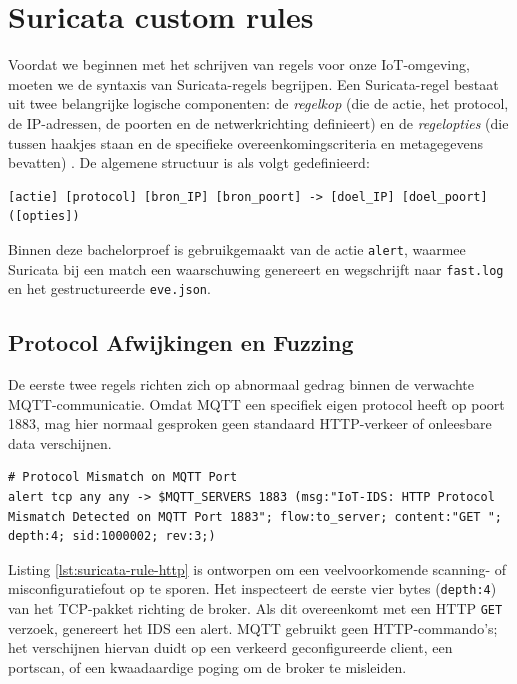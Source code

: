 \section{Suricata custom rules}

Voordat we beginnen met het schrijven van regels voor onze IoT-omgeving, moeten we de syntaxis van Suricata-regels begrijpen.
Een Suricata-regel bestaat uit twee belangrijke logische componenten: de \textit{regelkop} (die de actie, het protocol, de IP-adressen, de poorten en de netwerkrichting definieert) en de \textit{regelopties} (die tussen haakjes staan en de specifieke overeenkomingscriteria en metagegevens bevatten) \autocite{SuricataRulesDiff2024}. De algemene structuur is als volgt gedefinieerd:

\begin{verbatim}
[actie] [protocol] [bron_IP] [bron_poort] -> [doel_IP] [doel_poort] ([opties])
\end{verbatim}

Binnen deze bachelorproef is gebruikgemaakt van de actie \texttt{alert}, waarmee Suricata bij een match een waarschuwing genereert en wegschrijft naar \texttt{fast.log} en het gestructureerde \texttt{eve.json}.

\subsection{Protocol Afwijkingen en Fuzzing}
De eerste twee regels richten zich op abnormaal gedrag binnen de verwachte MQTT-communicatie. Omdat MQTT een specifiek eigen protocol heeft op poort 1883, mag hier normaal gesproken geen standaard HTTP-verkeer of onleesbare data verschijnen.

\begin{listing}[H]
\begin{verbatim}
# Protocol Mismatch on MQTT Port
alert tcp any any -> $MQTT_SERVERS 1883 (msg:"IoT-IDS: HTTP Protocol Mismatch Detected on MQTT Port 1883"; flow:to_server; content:"GET "; depth:4; sid:1000002; rev:3;)
\end{verbatim}
\caption{Suricata-regel voor het detecteren van een protocol-mismatch op de MQTT-poort.}
\label{lst:suricata-rule-http}
\end{listing}

Listing \ref{lst:suricata-rule-http} is ontworpen om een veelvoorkomende scanning- of misconfiguratiefout op te sporen. Het inspecteert de eerste vier bytes (\texttt{depth:4}) van het TCP-pakket richting de broker. Als dit overeenkomt met een HTTP \texttt{GET } verzoek, genereert het IDS een alert. MQTT gebruikt geen HTTP-commando's; het verschijnen hiervan duidt op een verkeerd geconfigureerde client, een portscan, of een kwaadaardige poging om de broker te misleiden.

